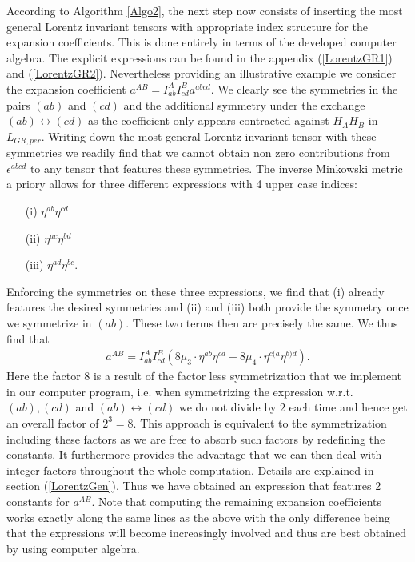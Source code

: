 \documentclass[a4paper,12pt, DIV=14, BCOR=5mm, twoside, headsepline, numbers=noenddot]{scrbook}
\begin{document}
According to Algorithm \ref{Algo2}, the next step now consists of inserting the most general Lorentz invariant tensors with appropriate index structure for the expansion coefficients. This is done entirely in terms of the developed computer algebra. The explicit expressions can be found in the appendix (\ref{LorentzGR1}) and (\ref{LorentzGR2}).
Nevertheless providing an illustrative example we consider the expansion coefficient $a^{AB} = I^{A}_{ab}I^{B}_{cd}a^{abcd}$. We clearly see the symmetries in the pairs $(ab)$ and $(cd)$ and the additional symmetry under the exchange $(ab) \leftrightarrow (cd)$ as the coefficient only appears contracted against $H_AH_B$ in $L_{GR,per}$. Writing down the most general Lorentz invariant tensor with these symmetries we readily find that we cannot obtain non zero contributions from $\epsilon^{abcd}$ to any tensor that features these symmetries. The inverse Minkowski metric a priory allows for three different expressions with 4 upper case indices:
\begin{itemize}
    \item[(i)] $\eta^{ab} \eta^{cd}$ 
    \item[(ii)] $\eta^{ac} \eta^{bd}$ 
    \item[(iii)] $\eta^{ad} \eta^{bc}$.
\end{itemize}
Enforcing the symmetries on these three expressions, we find that (i) already features the desired symmetries and (ii) and (iii) both provide the symmetry once we symmetrize in $(ab)$. These two terms then are precisely the same. We thus find that 
\begin{align}\label{ansatzExample}
    a^{AB} = I^{A}_{ab}I^{B}_{cd} \left ( 8\mu_3 \cdot \eta^{ab}\eta^{cd} + 8\mu_4 \cdot \eta^{c(a} \eta^{b)d}   \right ).
\end{align}
Here the factor $8$ is a result of the factor less symmetrization that we implement in our computer program, i.e. when symmetrizing the expression w.r.t. $(ab),(cd)$ and $(ab) \leftrightarrow (cd) $ we do not divide by $2$ each time and hence get an overall factor of $2^3=8$. This approach is equivalent to the symmetrization including these factors as we are free to absorb such factors by redefining the constants. It furthermore provides the advantage that we can then deal with integer factors throughout the whole computation. Details are explained in section (\ref{LorentzGen}).
Thus we have obtained an expression that features 2 constants for $a^{AB}$.
Note that computing the remaining expansion coefficients works exactly along the same lines as the above with the only difference being that the expressions will become increasingly involved and thus are best obtained by using computer algebra.
\end{document}
